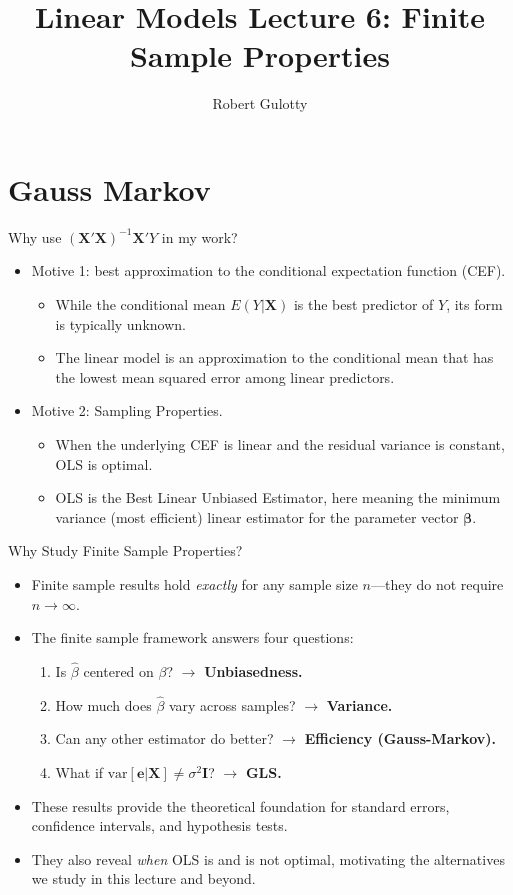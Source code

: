 \documentclass[aspectratio=169, handout]{beamer}
\title[PLSC 30700]{Linear Models Lecture 6: Finite Sample Properties}
\author{Robert Gulotty}
\institute[Chicago]{University of Chicago}
\numberwithin{equation}{section}
\begin{document}
\begin{frame}
\maketitle
\end{frame}
\section{Gauss Markov}

\begin{frame}{Why use $(\bm{X}'\bm{X})^{-1}\bm{X}'Y$ in my work?}
\begin{itemize}
\item Motive 1: best approximation to the conditional expectation function (CEF).
\begin{itemize}
\item While the conditional mean $E(Y|\bm{X})$ is the best predictor of $Y$, its form is typically unknown.
\item The linear model is an approximation to the conditional mean that has the lowest mean squared error among linear predictors.
\end{itemize}\pause
\item Motive 2: Sampling Properties.  
\begin{itemize}
\item When the underlying CEF is linear and the residual variance is constant, OLS is optimal.
\item OLS is the Best Linear Unbiased Estimator, here meaning the minimum variance (most efficient) linear estimator for the parameter vector $\bm{\beta}$.
\end{itemize}
\end{itemize}
\end{frame}

\begin{frame}{Why Study Finite Sample Properties?}
\begin{itemize}
\item Finite sample results hold \emph{exactly} for any sample size $n$---they do not require $n\to\infty$.
\item The finite sample framework answers four questions:
\begin{enumerate}
\item Is $\hat{\beta}$ centered on $\beta$? $\to$ \textbf{Unbiasedness.}
\item How much does $\hat{\beta}$ vary across samples? $\to$ \textbf{Variance.}
\item Can any other estimator do better? $\to$ \textbf{Efficiency (Gauss-Markov).}
\item What if $\text{var}[\bm{e}|\bm{X}]\neq\sigma^2\bm{I}$? $\to$ \textbf{GLS.}
\end{enumerate}\pause
\item These results provide the theoretical foundation for standard errors, confidence intervals, and hypothesis tests.
\item They also reveal \emph{when} OLS is and is not optimal, motivating the alternatives we study in this lecture and beyond.
\end{itemize}
\end{frame}
\end{document}
